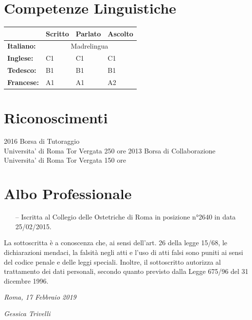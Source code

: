 \documentclass[11pt]{friggeri-cv}
\begin{document}
\section{Competenze Linguistiche}
\begin{table}[!h]
  \centering
  \renewcommand{\arraystretch}{1.45}
  \begin{tabular}{ p{3cm} p{3cm} p{3cm} p{3cm} }
    \hline
    & \textbf{Scritto}  & \textbf{Parlato} & \textbf{Ascolto}     \\     \hline
    \textbf{Italiano:}  & \multicolumn{3}{c}{Madrelingua}         \\
    \textbf{Inglese:}   & C1 & C1 & C1                            \\ 
    \textbf{Tedesco:}   & B1 & B1 & B1                            \\ 
    \textbf{Francese:}  & A1 & A1 & A2                            \\    \hline
  \end{tabular}
\end{table}

\newpage
\section{Riconoscimenti}
\begin{entrylist}
  \entry
    {2016}
    {Borsa di Tutoraggio}
    {\\Universita' di Roma Tor Vergata}
    {250 ore}
  \entry
    {2013}
    {Borsa di Collaborazione}
    {\\Universita' di Roma Tor Vergata}
    {150 ore}
\end{entrylist}

\vspace{-10pt}
\section{Albo Professionale}
\begin{itemize}
  \item[--] Iscritta al Collegio delle Ostetriche di Roma in posizione 
  n°2640 in data 25/02/2015.
\end{itemize}

\vspace{75pt}
\footnotesize La sottoscritta è a conoscenza che, ai sensi dell’art. 26 della legge 
15/68, le dichiarazioni mendaci, la falsità negli atti e l’uso di
atti falsi sono puniti ai sensi del codice penale e delle leggi speciali. Inoltre, il 
sottoscritto autorizza al trattamento dei dati
personali, secondo quanto previsto dalla Legge 675/96 del 31 dicembre 1996.

\vspace{75pt}
\begin{flushleft}
\large\emph{Roma, 17 Febbraio 2019}
\end{flushleft}
\begin{flushright}
\large\emph{Gessica Trivelli}
\end{flushright}
\end{document}
